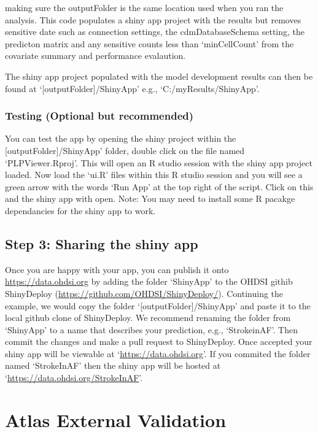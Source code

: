 \documentclass[
]{article}
\begin{document}
making sure the outputFolder is the same location used when you ran the
analysis. This code populates a shiny app project with the results but
removes sensitive date such as connection settings, the
cdmDatabaseSchema setting, the predicton matrix and any sensitive counts
less than `minCellCount' from the covariate summary and performance
evalaution.

The shiny app project populated with the model development results can
then be found at `{[}outputFolder{]}/ShinyApp' e.g.,
`C:/myResults/ShinyApp'.

\hypertarget{testing-optional-but-recommended}{%
\subsubsection{Testing (Optional but
recommended)}\label{testing-optional-but-recommended}}

You can test the app by opening the shiny project within the
{[}outputFolder{]}/ShinyApp' folder, double click on the file named
`PLPViewer.Rproj'. This will open an R studio session with the shiny app
project loaded. Now load the `ui.R' files within this R studio session
and you will see a green arrow with the words `Run App' at the top right
of the script. Click on this and the shiny app with open. Note: You may
need to install some R pacakge dependancies for the shiny app to work.

\hypertarget{step-3-sharing-the-shiny-app}{%
\subsection{Step 3: Sharing the shiny
app}\label{step-3-sharing-the-shiny-app}}

Once you are happy with your app, you can publish it onto
\url{https://data.ohdsi.org} by adding the folder `ShinyApp' to the
OHDSI githib ShinyDeploy (\url{https://github.com/OHDSI/ShinyDeploy/}).
Continuing the example, we would copy the folder
`{[}outputFolder{]}/ShinyApp' and paste it to the local github clone of
ShinyDeploy. We recommend renaming the folder from `ShinyApp' to a name
that describes your prediction, e.g., `StrokeinAF'. Then commit the
changes and make a pull request to ShinyDeploy. Once accepted your shiny
app will be viewable at `\url{https://data.ohdsi.org}'. If you commited
the folder named `StrokeInAF' then the shiny app will be hosted at
`\url{https://data.ohdsi.org/StrokeInAF}'.

\hypertarget{atlas-external-validation}{%
\section{Atlas External Validation}\label{atlas-external-validation}}
\end{document}
